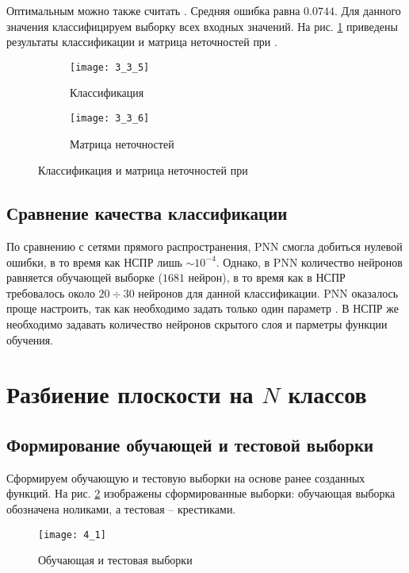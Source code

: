 Оптимальным можно также считать . Средняя ошибка равна $0.0744$. Для данного значения классифицируем выборку всех входных значений. На рис. \ref{fig:3_3_5} приведены результаты классификации и матрица неточностей при .
\begin{figure}[H]
\begin{center}
	\begin{subfigure}{0.49\textwidth}
		\texttt{[image: 3\_3\_5]}
		\caption{Классификация}
	\end{subfigure}
	\begin{subfigure}{0.49\textwidth}
		\texttt{[image: 3\_3\_6]}
		\caption{Матрица неточностей}
	\end{subfigure}
	\caption{Классификация и матрица неточностей при }
	\label{fig:3_3_5}
\end{center}
\end{figure}

\subsection{Сравнение качества классификации}


По сравнению с сетями прямого распространения, PNN смогла добиться нулевой ошибки, в то время как НСПР лишь $\sim 10^{-4}$. Однако, в PNN количество нейронов равняется обучающей выборке ($1681$ нейрон), в то время как в НСПР требовалось около $20 \div 30$ нейронов для данной классификации. PNN оказалось проще настроить, так как необходимо задать только один параметр . В НСПР же необходимо задавать количество нейронов скрытого слоя и парметры функции обучения.

\section{Разбиение плоскости на $N$ классов}

\subsection{Формирование обучающей и тестовой выборки}

Сформируем обучающую и тестовую выборки на основе ранее созданных функций. На рис. \ref{fig:4_1} изображены сформированные выборки: обучающая выборка обозначена ноликами, а тестовая -- крестиками.
\begin{figure}[H]
\begin{center}
	\texttt{[image: 4\_1]}
	\caption{Обучающая и тестовая выборки}
	\label{fig:4_1}
\end{center}
\end{figure}

